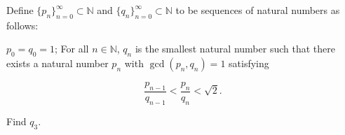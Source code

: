 Define $\{p_n\}_{n=0}^{\infty} \subset \mathbb{N}$ and $\{q_n\}_{n=0}^{\infty} \subset \mathbb{N}$ to be sequences of natural numbers as follows:

$p_0=q_0=1$; For all $n\in\mathbb{N}$, $q_n$ is the smallest natural number such that there exists a natural number $p_n$ with $\gcd(p_n,q_n)=1$ satisfying

\[
\dfrac{p_{n-1}}{q_{n-1}}<\dfrac{p_n}{q_n}<\sqrt{2}.
\]

Find $q_3$.
